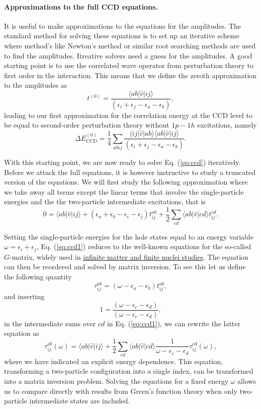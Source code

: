 \documentclass[%
oneside,                 %
final,                   %
10pt]{article}
\begin{document}
\paragraph{Approximations to the full CCD equations.}
It is useful to make approximations to the equations for the amplitudes. The standard method for solving these equations is to set up an iterative scheme where method's like Newton's method or similar root searching methods are used to find the amplitudes. 
Itreative solvers need a guess for the amplitudes. A good starting point is to use the correlated wave operator from perturbation theory to
first order in the interaction.
This means that we define the zeroth approximation to the amplitudes as 
\[
t^{(0)}=\frac{\langle ab \vert \hat{v} \vert ij \rangle}{\left(\epsilon_i+\epsilon_j-\epsilon_a-\epsilon_b\right)},
\]
leading to our first approximation for the correlation energy at the CCD level to be equal to second-order perturbation theory without $1p-1h$ excitations, namely
\[
\Delta E_{\mathrm{CCD}}^{(0)}=\frac{1}{4}\sum_{abij} \frac{\langle ij \vert \hat{v} \vert ab \rangle \langle ab \vert \hat{v} \vert ij \rangle}{\left(\epsilon_i+\epsilon_j-\epsilon_a-\epsilon_b\right)}.
\]

With this starting point, we are now ready to solve Eq. (\ref{eq:ccd}) iteratively. Before we attack the full equations, it is however instructive to study a truncated version of the equations. We will first study the following approximation where we take away all terms except the linear terms that involve the single-particle energies and the the two-particle intermediate excitations, that is
\begin{equation}
0 = \langle ab \vert \hat{v} \vert ij \rangle + \left(\epsilon_a+\epsilon_b-\epsilon_i-\epsilon_j\right)t_{ij}^{ab}+\frac{1}{2}\sum_{cd} \langle ab \vert \hat{v} \vert cd \rangle t_{ij}^{cd}.
\label{eq:ccd1}
\end{equation}

Setting the single-particle energies for the hole states equal to an energy variable $\omega = \epsilon_i+\epsilon_j$, Eq. (\ref{eq:ccd1}) reduces to the
well-known equations for the so-called $G$-matrix, widely used in \href{{http://www.sciencedirect.com/science/journal/03701573/261/3-4}}{infinite matter and finite nuclei studies}. The equation can then be reordered and solved by matrix inversion.  To see this let us define the following quantity
\[
\tau_{ij}^{ab}= \left(\omega-\epsilon_a-\epsilon_b\right)t_{ij}^{ab},
\]
and inserting 
\[
1=\frac{\left(\omega-\epsilon_c-\epsilon_d\right)}{\left(\omega-\epsilon_c-\epsilon_d\right)},
\]
in the intermediate sums over $cd$ in Eq. (\ref{eq:ccd1}), we can rewrite the latter equation as
\[
\tau_{ij}^{ab}(\omega)= \langle ab \vert \hat{v} \vert ij \rangle + \frac{1}{2}\sum_{cd} \langle ab \vert \hat{v} \vert cd \rangle \frac{1}{\omega-\epsilon_c-\epsilon_d}\tau_{ij}^{cd}(\omega),
\]
where we have indicated an explicit energy dependence. This equation, transforming a two-particle configuration into a single index, can be transformed into a matrix inversion problem.  Solving the equations for a fixed energy $\omega$ allows us to compare directly with results from Green's function theory when only two-particle intermediate states are included. 
\end{document}
